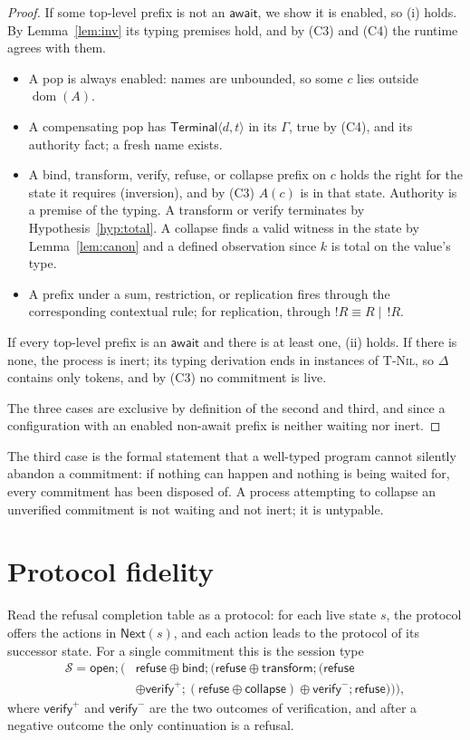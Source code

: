 \documentclass[11pt,openany]{book}
\theoremstyle{remark}
\newcommand{\dom}{\operatorname{dom}}
\begin{document}
\begin{proof}
If some top-level prefix is not an $\mathsf{await}$, we show it is
enabled, so (i) holds. By Lemma~\ref{lem:inv} its typing premises hold,
and by (C3) and (C4) the runtime agrees with them.
\begin{itemize}[leftmargin=1.5em]
\item A pop is always enabled: names are unbounded, so some $c$ lies
outside $\dom(A)$.
\item A compensating pop has $\mathsf{Terminal}\langle d,t\rangle$ in its
$\Gamma$, true by (C4), and its authority fact; a fresh name exists.
\item A bind, transform, verify, refuse, or collapse prefix on $c$ holds
the right for the state it requires (inversion), and by (C3) $A(c)$ is in
that state. Authority is a premise of the typing. A transform or verify
terminates by Hypothesis~\ref{hyp:total}. A collapse finds a valid witness
in the state by Lemma~\ref{lem:canon} and a defined observation since $k$
is total on the value's type.
\item A prefix under a sum, restriction, or replication fires through the
corresponding contextual rule; for replication, through
$!R\equiv R\mid\,!R$.
\end{itemize}
If every top-level prefix is an $\mathsf{await}$ and there is at least one,
(ii) holds. If there is none, the process is inert; its typing derivation
ends in instances of \textsc{T-Nil}, so $\Delta$ contains only tokens, and
by (C3) no commitment is live.

The three cases are exclusive by definition of the second and third, and
since a configuration with an enabled non-await prefix is neither waiting
nor inert.
\end{proof}

The third case is the formal statement that a well-typed program cannot
silently abandon a commitment: if nothing can happen and nothing is being
waited for, every commitment has been disposed of. A process attempting to
collapse an unverified commitment is not waiting and not inert; it is
untypable.

\section{Protocol fidelity}
\label{sec:fidelity}

Read the refusal completion table as a protocol: for each live state $s$,
the protocol offers the actions in $\mathsf{Next}(s)$, and each action
leads to the protocol of its successor state. For a single commitment this
is the session type
\[
\begin{aligned}
\mathcal S=\mathsf{open};\bigl(&\mathsf{refuse}\oplus\mathsf{bind};
(\mathsf{refuse}\oplus\mathsf{transform};(\mathsf{refuse}\\
&\oplus\mathsf{verify}^{+};(\mathsf{refuse}\oplus\mathsf{collapse})
\oplus\mathsf{verify}^{-};\mathsf{refuse}))\bigr),
\end{aligned}
\]
where $\mathsf{verify}^{+}$ and $\mathsf{verify}^{-}$ are the two outcomes
of verification, and after a negative outcome the only continuation is a
refusal.
\end{document}
